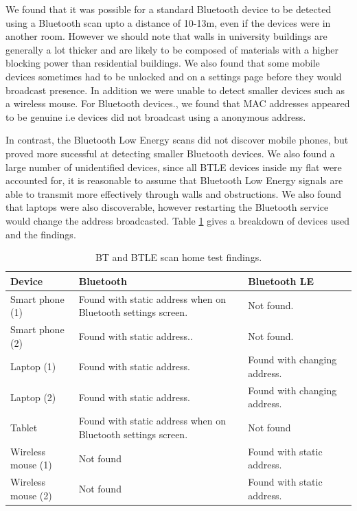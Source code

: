 \documentclass{l4proj}
\begin{document}
We found that it was possible for a standard Bluetooth device to be detected using a Bluetooth scan upto a distance of 10-13m, even if the devices were in another room. However we should note that walls in university buildings are generally a lot thicker and are likely to be composed of materials with a higher blocking power than residential buildings. We also found that some mobile devices sometimes had to be unlocked and on a settings page before they would broadcast presence. In addition we were unable to detect smaller devices such as a wireless mouse. For Bluetooth devices., we found that MAC addresses appeared to be genuine i.e devices did not broadcast using a anonymous address.

In contrast, the Bluetooth Low Energy scans did not discover mobile phones, but proved more sucessful at detecting smaller Bluetooth devices. We also found a large number of unidentified devices, since all BTLE devices inside my flat were accounted for, it is reasonable to assume that Bluetooth Low Energy signals are able to transmit more effectively through walls and obstructions. We also found that laptops were also discoverable, however restarting the Bluetooth service would change the address broadcasted. Table \ref{table:evalscan} gives a breakdown of devices used and the findings. 

\begin{table}
\begin{tabularx}{\textwidth}{|X|X|X|X|}
\hline
\textbf{Device} & \textbf{Bluetooth} & \textbf{Bluetooth LE} \tabularnewline
\hline
Smart phone (1) & Found with static address when on Bluetooth settings screen. & Not found. \\
\hline
Smart phone (2) & Found with static address.. & Not found. \\
\hline
Laptop (1) & Found with static address. & Found with changing address. \\
\hline
Laptop (2) & Found with static address. & Found with changing address. \\
\hline
Tablet & Found with static address when on Bluetooth settings screen. & Not found \\
\hline
Wireless mouse (1) & Not found & Found with static address. \\
\hline
Wireless mouse (2) & Not found & Found with static address. \\
\hline
\end{tabularx}
\caption{BT and BTLE scan home test findings.}
\label{table:evalscan}
\end{table}
\end{document}
